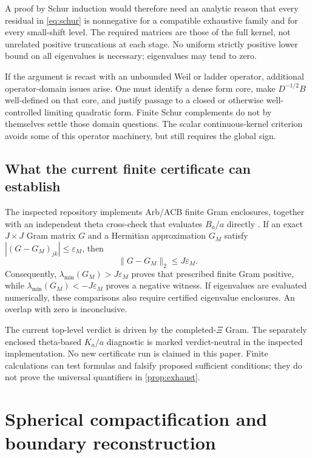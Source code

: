 \documentclass[11pt,letterpaper]{article}
\numberwithin{equation}{section}
\theoremstyle{definition}
\theoremstyle{remark}
\begin{document}
A proof by Schur induction would therefore need an analytic reason that every residual in \eqref{eq:schur} is nonnegative for a compatible exhaustive family and for every small-shift level. The required matrices are those of the full kernel, not unrelated positive truncations at each stage. No uniform strictly positive lower bound on all eigenvalues is necessary; eigenvalues may tend to zero.

If the argument is recast with an unbounded Weil or ladder operator, additional operator-domain issues arise. One must identify a dense form core, make $D^{-1/2}B$ well-defined on that core, and justify passage to a closed or otherwise well-controlled limiting quadratic form. Finite Schur complements do not by themselves settle those domain questions. The scalar continuous-kernel criterion avoids some of this operator machinery, but still requires the global sign.

\subsection{What the current finite certificate can establish}
The inspected repository implements Arb/ACB finite Gram enclosures, together with an independent theta cross-check that evaluates $B_a/a$ directly \cite{repo}. If an exact $J\times J$ Gram matrix $G$ and a Hermitian approximation $G_M$ satisfy $|(G-G_M)_{jk}|\le\varepsilon_M$, then
\[
\|G-G_M\|_2\le J\varepsilon_M.
\]
Consequently, $\lambda_{\min}(G_M)>J\varepsilon_M$ proves that prescribed finite Gram positive, while $\lambda_{\min}(G_M)<-J\varepsilon_M$ proves a negative witness. If eigenvalues are evaluated numerically, these comparisons also require certified eigenvalue enclosures. An overlap with zero is inconclusive.

The current top-level verdict is driven by the completed-$\Xi$ Gram. The separately enclosed theta-based $K_a/a$ diagnostic is marked verdict-neutral in the inspected implementation. No new certificate run is claimed in this paper. Finite calculations can test formulas and falsify proposed sufficient conditions; they do not prove the universal quantifiers in \cref{prop:exhaust}.

\section{Spherical compactification and boundary reconstruction}
\end{document}
